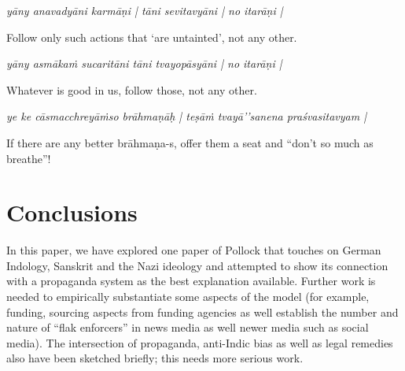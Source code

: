 \begin{myquote}
{\sl yāny anavadyāni karmāṇi | tāni sevitavyāni | no itarāṇi |}

{\rm Follow only such actions that `are untainted', not any other.}

{\sl yāny asmākaṁ sucaritāni tāni tvayopāsyāni | no itarāṇi |}

{\rm Whatever is good in us, follow those, not any other.}

{\sl ye ke cāsmacchreyāṁso brāhmaṇāḥ | teṣāṁ tvayā’’sanena praśvasitavyam |}

{\rm If there are any better brāhmaṇa-s, offer them a seat and “don't so much as breathe”!}
\end{myquote}
\vskip -20pt

\section*{Conclusions}

In this paper, we have explored one paper of Pollock that touches on German Indology, Sanskrit and the Nazi ideology and attempted to show its connection with a propaganda system as the best explanation available. Further work is needed to empirically substantiate some aspects of the model (for example, funding, sourcing aspects from funding agencies as well establish the number and nature of “flak enforcers” in news media as well newer media such as social media). The intersection of propaganda, anti-Indic bias as well as legal remedies also have been sketched briefly; this needs more serious work.


